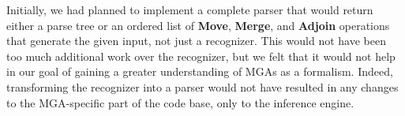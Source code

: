 \documentclass{article}
\begin{document}
Initially, we had planned to implement a complete parser that would
return either a parse tree or an ordered list of \textbf{Move},
\textbf{Merge}, and \textbf{Adjoin} operations that generate the given
input, not just a recognizer.  This would not have been too much
additional work over the recognizer, but we felt that it would not
help in our goal of gaining a greater understanding of MGAs as a
formalism.  Indeed, transforming the recognizer into a parser would
not have resulted in any changes to the MGA-specific part of the
code base, only to the inference engine.




\cleardoublepage
{}
{}


\end{document}
